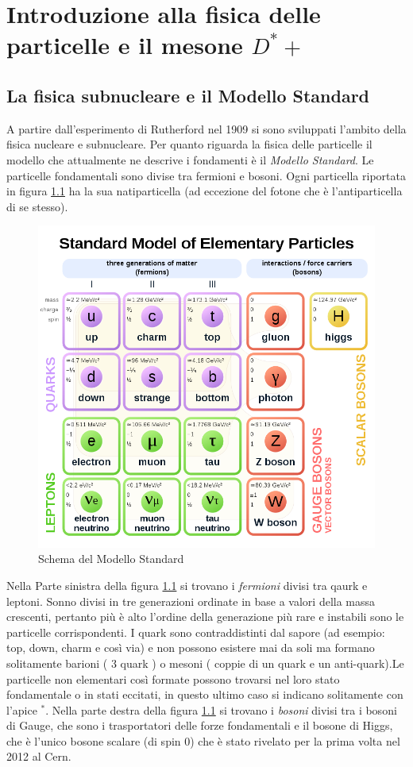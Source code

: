 \chapter{Introduzione alla fisica delle particelle e il mesone $D^*+$ }

\section{La fisica subnucleare e il Modello Standard}
A partire dall'esperimento di Rutherford nel 1909 si sono sviluppati l'ambito della fisica nucleare e subnucleare. Per quanto riguarda la fisica delle particelle il modello che attualmente ne descrive i fondamenti è il \textit{Modello Standard}. Le particelle fondamentali sono divise tra fermioni e bosoni. Ogni particella riportata in figura \ref{fig:ModelloStandard} ha la sua natiparticella (ad eccezione del fotone che è l'antiparticella di se stesso). 

    \begin{figure}[htbp]
        \centering
        \includegraphics[width=0.65\linewidth]{introParticelle/ModelloStandard.png}
        \caption{ Schema del Modello Standard}
        \label{fig:ModelloStandard}
    \end{figure}
    
Nella Parte sinistra della figura \ref{fig:ModelloStandard} si trovano i \textit{fermioni} divisi tra qaurk e leptoni. Sonno divisi in tre generazioni ordinate in base a valori della massa crescenti, pertanto più è alto l'ordine della generazione più rare e instabili sono le particelle corrispondenti. I quark sono contraddistinti dal sapore (ad esempio: top, down, charm e così via) e non possono esistere mai da soli ma formano solitamente barioni ( 3 quark ) o mesoni ( coppie di un quark e un anti-quark).Le particelle non elementari così formate possono trovarsi nel loro stato fondamentale o in stati eccitati, in questo ultimo caso si indicano solitamente con l'apice $^*$. \cite{libro_nucleare}
Nella parte destra della figura \ref{fig:ModelloStandard} si trovano i \textit{bosoni} divisi tra i bosoni di Gauge, che sono i trasportatori delle forze fondamentali e il bosone di Higgs, che è l'unico bosone scalare (di spin 0) che è stato rivelato per la prima volta nel 2012 al Cern.

